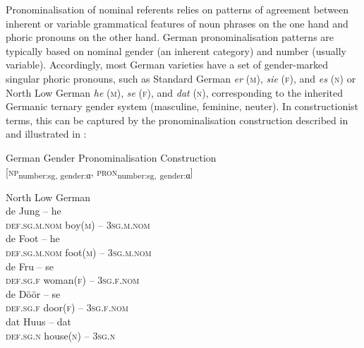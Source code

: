 \documentclass[output=paper]{langsci/langscibook}
\begin{document}
Pronominalisation of nominal referents relies on patterns of agreement between inherent or variable grammatical features of noun phrases on the one hand and phoric pronouns on the other hand. German pronominalisation patterns are typically based on nominal gender (an inherent category) and number (usually variable). Accordingly, most German varieties have a set of gender-marked singular phoric pronouns, such as Standard German \textit{er} (\textsc{m}), \textit{sie} (\textsc{f}), and \textit{es} (\textsc{n}) or North Low German \textit{he} (\textsc{m}), \textit{se} (\textsc{f}), and \textit{dat} (\textsc{n}), corresponding to the inherited Germanic ternary gender system (masculine, feminine, neuter). In constructionist terms, this can be captured by the pronominalisation construction described in  and illustrated in :

\ea
\label{ex:hoeder:10}
	German Gender Pronominalisation Construction\\
     {[}\textsc{np}\textsubscript{number:sg, gender:}\textsubscript{α}, \textsc{pron}\textsubscript{number:sg,} \textsubscript{gender:}\textsubscript{α}{]}\\
     \z
     
\ea\label{ex:hoeder:11}
	North Low German\\
	\ea\label{ex:hoeder:11a}	
	\gll de Jung – he\\
     \textsc{def.sg.m.nom}{} boy(\textsc{m}) – 3\textsc{sg.m.nom}\\
 
	\ex \label{ex:hoeder:11b}
	\gll de Foot – he\\
     \textsc{def.sg.m.nom}{} foot(\textsc{m}) – 3\textsc{sg.m.nom}\\
     
     \ex \label{ex:hoeder:11c}
	\gll de Fru – se\\
     \textsc{def.sg.f} woman(\textsc{f}) – 3\textsc{sg.f.nom}\\

	\ex \label{ex:hoeder:11d}
	\gll de Döör – se\\
     \textsc{def.sg.f} door(\textsc{f}) – 3\textsc{sg.f.nom}\\
     
     \ex \label{ex:hoeder:11e}
	\gll dat Huus – dat\\
     \textsc{def.sg.n}{} house(\textsc{n}) – 3\textsc{sg.n}\\
     
     \z
     \z
     
\end{document}
